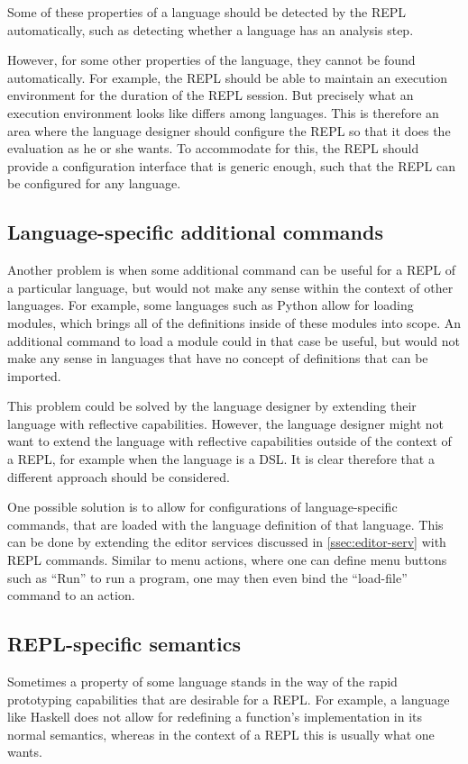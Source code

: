 Some of these properties of a language should be detected by the REPL
automatically, such as detecting whether a language has an analysis
step.

However, for some other properties of the language, they cannot be
found automatically. For example, the REPL should be able to maintain
an execution environment for the duration of the REPL session. But
precisely what an execution environment looks like differs among
languages. This is therefore an area where the language designer
should configure the REPL so that it does the evaluation as he or she
wants. To accommodate for this, the REPL should provide a
configuration interface that is generic enough, such that the REPL can
be configured for any language.

\subsection{Language-specific additional commands}
\label{sec:lang-spec-addit}
Another problem is when some additional command can be useful for a
REPL of a particular language, but would not make any sense within the
context of other languages. For example, some languages such as Python
allow for loading modules, which brings all of the definitions inside
of these modules into scope. An additional command to load a module
could in that case be useful, but would not make any sense in
languages that have no concept of definitions that can be imported.

This problem could be solved by the language designer by extending
their language with reflective capabilities. However, the language
designer might not want to extend the language with reflective
capabilities outside of the context of a REPL, for example when the
language is a DSL. It is clear therefore that a different approach
should be considered.

One possible solution is to allow for configurations of
language-specific commands, that are loaded with the language
definition of that language. This can be done by extending the editor
services discussed in \cref{ssec:editor-serv} with REPL
commands. Similar to menu actions, where one can define menu buttons
such as ``Run'' to run a program, one may then even bind the
``load-file'' command to an action.

\subsection{REPL-specific semantics}
\label{sec:repl-spec-semant}
Sometimes a property of some language stands in the way of the rapid
prototyping capabilities that are desirable for a REPL. For example, a
language like Haskell does not allow for redefining a function's
implementation in its normal semantics, whereas in the context of a
REPL this is usually what one wants.

